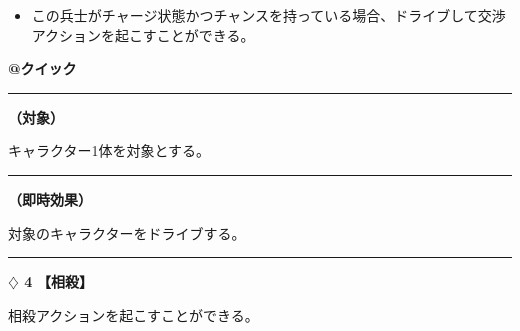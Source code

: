 \documentclass[twocolumn,a5paper,papersize,10pt]{jarticle}
\begin{document}
\vspace{-1zh}%
\begin{itemize}
\setlength{\leftskip}{-0.3cm}
\setlength{\parskip}{0pt} %

\item この兵士がチャージ状態かつチャンスを持っている場合、ドライブして交渉アクションを起こすことができる。
\vspace{-1zh}%
\end{itemize}

\begin{tcolorbox}[title={\small\bf【Action】交渉}{\scriptsize （兵士起因）}]

{\scriptsize\bf @クイック }

\vspace{1mm} %
\hrule height 0.1mm depth 0mm width 62mm %
\vspace{1mm} %

{\bf（対象）}

キャラクター1体を対象とする。

\vspace{1mm} %
\hrule height 0.1mm depth 0mm width 62mm %
\vspace{1mm} %

{\bf（即時効果）}

対象のキャラクターをドライブする。

\vspace{1mm} %
\end{tcolorbox}

\vspace{-1zh}
  
 

\vspace{3mm} %
\hrule height 0.5mm depth 0mm width 66.5mm %
\vspace{1mm} %
{\Large\bf $\diamondsuit$ 4} {\normalsize\bf【相殺】} %
\vspace{1mm} %

相殺アクションを起こすことができる。
\end{document}
